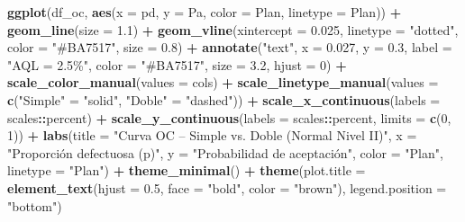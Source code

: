 \documentclass[
  12pt,
]{article}
\newenvironment{Shaded}{\begin{snugshade}}{\end{snugshade}}
\newcommand{\AttributeTok}[1]{\textcolor[rgb]{0.13,0.29,0.53}{#1}}
\newcommand{\DecValTok}[1]{\textcolor[rgb]{0.00,0.00,0.81}{#1}}
\newcommand{\FloatTok}[1]{\textcolor[rgb]{0.00,0.00,0.81}{#1}}
\newcommand{\FunctionTok}[1]{\textcolor[rgb]{0.13,0.29,0.53}{\textbf{#1}}}
\newcommand{\NormalTok}[1]{#1}
\newcommand{\OtherTok}[1]{\textcolor[rgb]{0.56,0.35,0.01}{#1}}
\newcommand{\SpecialCharTok}[1]{\textcolor[rgb]{0.81,0.36,0.00}{\textbf{#1}}}
\newcommand{\StringTok}[1]{\textcolor[rgb]{0.31,0.60,0.02}{#1}}
\begin{document}
\begin{Shaded}
\begin{Highlighting}[]
\FunctionTok{ggplot}\NormalTok{(df\_oc, }\FunctionTok{aes}\NormalTok{(}\AttributeTok{x =}\NormalTok{ pd, }\AttributeTok{y =}\NormalTok{ Pa, }\AttributeTok{color =}\NormalTok{ Plan, }\AttributeTok{linetype =}\NormalTok{ Plan)) }\SpecialCharTok{+}
  \FunctionTok{geom\_line}\NormalTok{(}\AttributeTok{size =} \FloatTok{1.1}\NormalTok{) }\SpecialCharTok{+}
  \FunctionTok{geom\_vline}\NormalTok{(}\AttributeTok{xintercept =} \FloatTok{0.025}\NormalTok{, }\AttributeTok{linetype =} \StringTok{"dotted"}\NormalTok{,}
             \AttributeTok{color =} \StringTok{"\#BA7517"}\NormalTok{, }\AttributeTok{size =} \FloatTok{0.8}\NormalTok{) }\SpecialCharTok{+}
  \FunctionTok{annotate}\NormalTok{(}\StringTok{"text"}\NormalTok{, }\AttributeTok{x =} \FloatTok{0.027}\NormalTok{, }\AttributeTok{y =} \FloatTok{0.3}\NormalTok{, }\AttributeTok{label =} \StringTok{"AQL = 2.5\%"}\NormalTok{,}
           \AttributeTok{color =} \StringTok{"\#BA7517"}\NormalTok{, }\AttributeTok{size =} \FloatTok{3.2}\NormalTok{, }\AttributeTok{hjust =} \DecValTok{0}\NormalTok{) }\SpecialCharTok{+}
  \FunctionTok{scale\_color\_manual}\NormalTok{(}\AttributeTok{values =}\NormalTok{ cols) }\SpecialCharTok{+}
  \FunctionTok{scale\_linetype\_manual}\NormalTok{(}\AttributeTok{values =} \FunctionTok{c}\NormalTok{(}\StringTok{"Simple"} \OtherTok{=} \StringTok{"solid"}\NormalTok{, }\StringTok{"Doble"} \OtherTok{=} \StringTok{"dashed"}\NormalTok{)) }\SpecialCharTok{+}
  \FunctionTok{scale\_x\_continuous}\NormalTok{(}\AttributeTok{labels =}\NormalTok{ scales}\SpecialCharTok{::}\NormalTok{percent) }\SpecialCharTok{+}
  \FunctionTok{scale\_y\_continuous}\NormalTok{(}\AttributeTok{labels =}\NormalTok{ scales}\SpecialCharTok{::}\NormalTok{percent, }\AttributeTok{limits =} \FunctionTok{c}\NormalTok{(}\DecValTok{0}\NormalTok{, }\DecValTok{1}\NormalTok{)) }\SpecialCharTok{+}
  \FunctionTok{labs}\NormalTok{(}\AttributeTok{title =} \StringTok{"Curva OC – Simple vs. Doble (Normal Nivel II)"}\NormalTok{,}
       \AttributeTok{x =} \StringTok{"Proporción defectuosa (p)"}\NormalTok{,}
       \AttributeTok{y =} \StringTok{"Probabilidad de aceptación"}\NormalTok{,}
       \AttributeTok{color =} \StringTok{"Plan"}\NormalTok{, }\AttributeTok{linetype =} \StringTok{"Plan"}\NormalTok{) }\SpecialCharTok{+}
  \FunctionTok{theme\_minimal}\NormalTok{() }\SpecialCharTok{+}
  \FunctionTok{theme}\NormalTok{(}\AttributeTok{plot.title =} \FunctionTok{element\_text}\NormalTok{(}\AttributeTok{hjust =} \FloatTok{0.5}\NormalTok{, }\AttributeTok{face =} \StringTok{"bold"}\NormalTok{, }\AttributeTok{color =} \StringTok{"brown"}\NormalTok{),}
        \AttributeTok{legend.position =} \StringTok{"bottom"}\NormalTok{)}
\end{Highlighting}
\end{Shaded}
\end{document}
